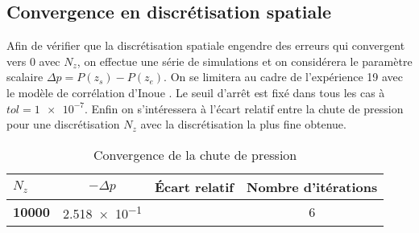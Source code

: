 \subsection{Convergence en discrétisation spatiale}

Afin de vérifier que la discrétisation spatiale engendre des erreurs qui convergent vers 0 avec $N_z$, on effectue une série de simulations et on considérera le paramètre scalaire $\Delta p = P(z_s)-P(z_e)$.  On se limitera au cadre de l'expérience 19 avec le modèle de corrélation d'Inoue \cite{inoueInbundleVoidMeasurement1993}. Le seuil d'arrêt est fixé dans tous les cas à $tol = \num{1e-7}$. Enfin on s'intéressera à l'écart relatif entre la chute de pression pour une discrétisation $N_z$ avec la discrétisation la plus fine obtenue.



\begin{table}[H]
\caption{Convergence de la chute de pression}
\vspace{5pt}
    \centering
    \begin{tabular}{@{}lccc@{}}
        \toprule
               \textbf{$N_z$}& \textbf{$-\Delta p$}& \textbf{Écart relatif} & \textbf{Nombre d'itérations}\\
        \midrule
          \textbf{10000}  & \num{2.518e-1} & & 6 \\
                 
        \bottomrule  
    \end{tabular}
    \label{PressureDrop}
\end{table}